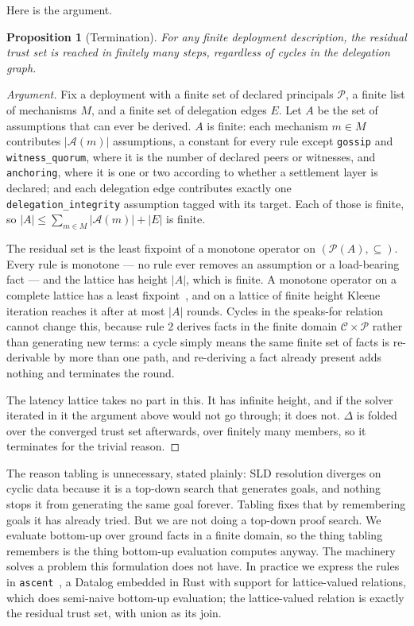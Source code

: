 \documentclass[11pt]{article}
\newtheorem{proposition}{Proposition}
\begin{document}
Here is the argument.

\begin{proposition}[Termination]
For any finite deployment description, the residual trust set is reached in
finitely many steps, regardless of cycles in the delegation graph.
\end{proposition}

\begin{proof}[Argument]
Fix a deployment with a finite set of declared principals $\mathcal{P}$, a
finite list of mechanisms $M$, and a finite set of delegation edges $E$. Let
$A$ be the set of assumptions that can ever be derived. $A$ is finite: each
mechanism $m \in M$ contributes $|\mathcal{A}(m)|$ assumptions, a constant for
every rule except \texttt{gossip} and \texttt{witness\_quorum}, where it is
the number of declared peers or witnesses, and \texttt{anchoring}, where it is
one or two according to whether a settlement layer is declared; and each
delegation edge contributes exactly one \texttt{delegation\_integrity}
assumption tagged with its target. Each of those is finite, so
$|A| \le \sum_{m \in M} |\mathcal{A}(m)| + |E|$ is finite.

The residual set is the least fixpoint of a monotone operator on
$(\mathcal{P}(A), \subseteq)$. Every rule is monotone --- no rule ever removes
an assumption or a load-bearing fact --- and the lattice has height $|A|$,
which is finite. A monotone operator on a complete lattice has a least
fixpoint~\cite{tarski}, and on a lattice of finite height Kleene iteration
reaches it after at most $|A|$ rounds. Cycles in the \textsf{speaks-for}
relation cannot change this, because rule 2 derives facts in the finite domain
$\mathcal{C} \times \mathcal{P}$ rather than generating new terms: a cycle
simply means the same finite set of facts is re-derivable by more than one
path, and re-deriving a fact already present adds nothing and terminates the
round.

The latency lattice takes no part in this. It has infinite height, and if the
solver iterated in it the argument above would not go through; it does not.
$\Delta$ is folded over the converged trust set afterwards, over finitely many
members, so it terminates for the trivial reason.
\end{proof}

The reason tabling is unnecessary, stated plainly: SLD resolution diverges on
cyclic data because it is a top-down search that generates goals, and nothing
stops it from generating the same goal forever. Tabling fixes that by
remembering goals it has already tried. But we are not doing a top-down proof
search. We evaluate bottom-up over ground facts in a finite domain, so the
thing tabling remembers is the thing bottom-up evaluation computes anyway.
The machinery solves a problem this formulation does not have. In practice we
express the rules in \texttt{ascent}~\cite{ascent}, a Datalog embedded in Rust
with support for lattice-valued relations, which does semi-naive bottom-up
evaluation; the lattice-valued relation is exactly the residual trust set,
with union as its join.
\end{document}
